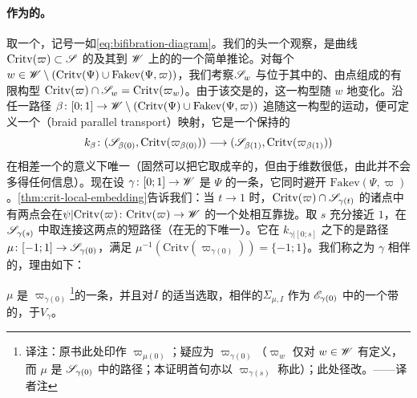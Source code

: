 \paragraph{作为\trMatchingCycle{}的\trVanishingCycle{}。}\label{sub:vanishing-as-matching}
取一个\trExact\trLefschetz\trBifibration，记号一如\eqref{eq:bifibration-diagram}。我们的头一个观察，是\trCriticalValue{}曲线 $\mathrm{Critv}(\varpi)\subset\mathscr{S}$ 的\trTopology{}及其到 $\mathscr{W}$ 上的\trProjection{}的一个简单推论。对每个 $w\in\mathscr{W}\setminus(\mathrm{Critv}(\Psi)\cup\mathrm{Fakev}(\Psi,\varpi))$，我们考察\trSurface{}$\mathscr{S}_w$ 与位于其中的、由点组成的有限构型 $\mathrm{Critv}(\varpi)\cap\mathscr{S}_w=\mathrm{Critv}(\varpi_w)$。由于该交是\trTransverse{}的，这一构型随 $w$ \trSmooth{}地变化。沿任一路径 $\beta\colon[0;1]\to\mathscr{W}\setminus(\mathrm{Critv}(\Psi)\cup\mathrm{Fakev}(\Psi,\varpi))$ 追随这一构型的运动，便可定义一个\textbf{\trBraid\trParallelTransport}（braid parallel transport）映射，它是一个保持\trOrientation{}的\trDiffeomorphism
\begin{equation*}
k_\beta\colon(\mathscr{S}_{\beta(0)},\mathrm{Critv}(\varpi_{\beta(0)}))
\longrightarrow(\mathscr{S}_{\beta(1)},\mathrm{Critv}(\varpi_{\beta(1)}))
\end{equation*}
在相差一个\trIsotopy{}的意义下唯一（固然可以把它取成辛的，但由于维数很低，由此并不会多得任何信息）。现在设 $\gamma\colon[0;1]\to\mathscr{W}$ 是 $\Psi$ 的一条\trVanishingPath，它同时避开 $\mathrm{Fakev}(\Psi,\varpi)$。\cref{thm:crit-local-embedding}告诉我们：当 $t\to1$ 时，$\mathrm{Critv}(\varpi)\cap\mathscr{S}_{\gamma(t)}$ 的诸点中有两点会在\trCovering{}$\psi|\mathrm{Critv}(\varpi)\colon\mathrm{Critv}(\varpi)\to\mathscr{W}$ 的一个\trBranchPoint{}处相互靠拢。取 $s$ 充分接近 $1$，在 $\mathscr{S}_{\gamma(s)}$ 中取连接这两点的短路径（在无\trOrientation{}的\trIsotopy{}下唯一）。它在 $k_{\gamma|[0;s]}$ 之下的\trPreimage{}是\trEmbedding{}路径 $\mu\colon[-1;1]\to\mathscr{S}_{\gamma(0)}$，满足 $\mu^{-1}(\mathrm{Critv}(\varpi_{\gamma(0)}))=\{-1;1\}$。我们称之为 $\gamma$ 相伴的\trMatchingPath，理由如下：
\begin{lemma}\label{thm:vanishing-as-matching-cycle}
$\mu$ 是 $\varpi_{\gamma(0)}$\footnote{译注：原书此处印作 $\varpi_{\mu(0)}$；疑应为 $\varpi_{\gamma(0)}$（$\varpi_w$ 仅对 $w\in\mathscr{W}$ 有定义，而 $\mu$ 是 $\mathscr{S}_{\gamma(0)}$ 中的路径；本证明首句亦以 $\varpi_{\gamma(s)}$ 称此\trObject）；此处径改。——译者注}的一条\trMatchingPath，并且对\trIsotopy{}$I$ 的适当选取，相伴的\trMatchingCycle{}$\Sigma_{\mu,I}$ 作为 $\mathscr{E}_{\gamma(0)}$ 中的一个带\trFrame{}的\trLagrange\trSphere，\trIsotopy{}于\trVanishingCycle{}$V_\gamma$。
\end{lemma}
